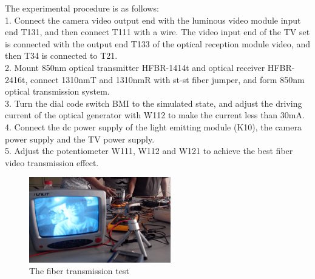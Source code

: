 \documentclass[a4paper]{article}
\begin{document}
The experimental procedure is as follows:\\
1. Connect the camera video output end with the luminous video module input end T131, and then connect T111 with a wire. The video input end of the TV set is connected with the output end T133 of the optical reception module video, and then T34 is connected to T21.\\
2. Mount 850nm optical transmitter HFBR-1414t and optical receiver HFBR-2416t, connect 1310nmT and 1310nmR with st-st fiber jumper, and form 850nm optical transmission system.\\
3. Turn the dial code switch BMI to the simulated state, and adjust the driving current of the optical generator with W112 to make the current less than 30mA.\\\cite{Analogue optical fibre communications}
4. Connect the dc power supply of the light emitting module (K10), the camera power supply and the TV power supply.\\
5. Adjust the potentiometer W111, W112 and W121 to achieve the best fiber video transmission effect.
\begin{figure}[h]
	\includegraphics[width=0.55\textwidth]{11.png}
	\caption{The fiber transmission test}
\end{figure}
\end{document}
